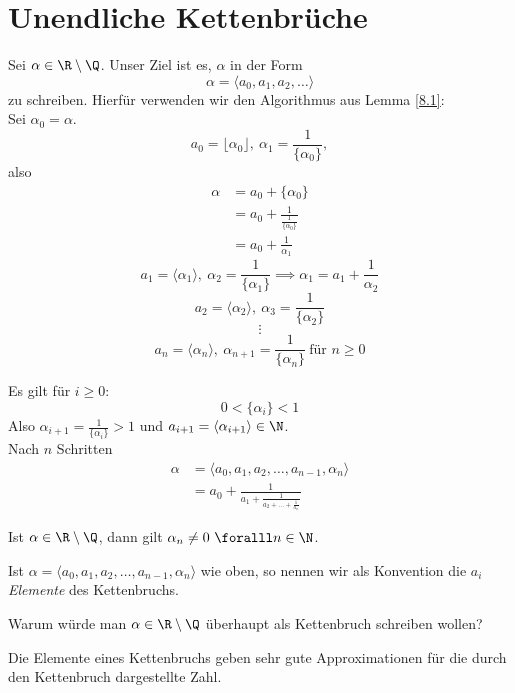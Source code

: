 \section{Unendliche Kettenbrüche}

Sei $\alpha \in \R \setminus \Q$. Unser Ziel ist es, $\alpha$ in der Form
\[ \alpha = \langle a_0,a_1,a_2,\dots\rangle \]
zu schreiben. Hierfür verwenden wir den Algorithmus aus Lemma \ref{8.1}:\\
Sei $\alpha_0 = \alpha$.
\[ a_0 = \lfloor \alpha_0 \rfloor,\ \alpha_1 = \frac{1}{\{\alpha_0\}}, \]
also 
\begin{align*}
	\alpha &= a_0 + \{\alpha_0\}\\
	&= a_0 + \frac{1}{\frac{1}{\{\alpha_0\}}}\\
	&= a_0 + \frac{1}{\alpha_1}
\end{align*}
\[ a_1 = \langle \alpha_1 \rangle,\ \alpha_2 = \frac{1}{\{ \alpha_1 \}} \implies \alpha_1 = a_1 + \frac{1}{\alpha_2} \]
\[ a_2 = \langle \alpha_2 \rangle,\ \alpha_3 = \frac{1}{\{ \alpha_2 \}} \]
\[\vdots\]
\[ a_n = \langle \alpha_n \rangle,\ \alpha_{n+1} = \frac{1}{\{ \alpha_n \}} \ \text{für } n \geq 0 \]

\begin{rem*}
	Es gilt für $i \geq 0$:
	\[ 0 < \{\alpha_i\} < 1 \]
	Also $\alpha_{i+1} = \frac{1}{\{\alpha_i\}} > 1$ und $a_{i+1} = \langle \alpha_{i+1} \rangle \in \N$.\\
	Nach $n$ Schritten
	\begin{align*}
		\alpha &= \langle a_0,a_1,a_2,\dotsc,a_{n-1},\alpha_n \rangle\\
		&= a_0 + \frac{1}{a_1 + \frac{1}{a_2 + \dots + \frac{1}{a_n}}}
	\end{align*}
\end{rem*}

\begin{rem*}
	Ist $\alpha \in \R \setminus \Q$, dann gilt $\alpha_n \neq 0 \ \foralll n \in \N$.
\end{rem*}

Ist $\alpha = \langle a_0,a_1,a_2,\dotsc,a_{n-1},\alpha_n \rangle$ wie oben, so nennen wir als Konvention die $a_i$ \emph{Elemente} des Kettenbruchs.

\begin{frage*}
	Warum würde man $\alpha \in \R \setminus \Q$ überhaupt als Kettenbruch schreiben wollen?
\end{frage*}

\begin{idee*}
	Die Elemente eines Kettenbruchs geben sehr gute Approximationen für die durch den Kettenbruch dargestellte Zahl.
\end{idee*}

